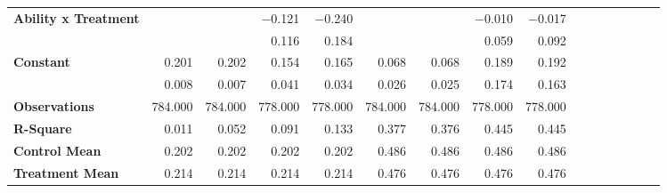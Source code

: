 \begin{tabular}{@{\extracolsep{5pt}}lrrrrrrrrrrrrrrr}
{\bf Ability x Treatment} & \phantom{***} & \phantom{***} & $-$0.121\phantom{\phantom{)}***} & $-$0.240\phantom{\phantom{)}***} & \phantom{***} & \phantom{***} & $-$0.010\phantom{\phantom{)}***} & $-$0.017\phantom{\phantom{)}***} \\
{\bf } & \phantom{***} & \phantom{***} & 0.116\phantom{\phantom{)}***} & 0.184\phantom{\phantom{)}***} & \phantom{***} & \phantom{***} & 0.059\phantom{\phantom{)}***} & 0.092\phantom{\phantom{)}***} \\
{\bf Constant} & 0.201\phantom{\phantom{)}***} & 0.202\phantom{\phantom{)}***} & 0.154\phantom{\phantom{)}***} & 0.165\phantom{\phantom{)}***} & 0.068\phantom{\phantom{)}***} & 0.068\phantom{\phantom{)}***} & 0.189\phantom{\phantom{)}***} & 0.192\phantom{\phantom{)}***} \\
{\bf } & 0.008\phantom{\phantom{)}***} & 0.007\phantom{\phantom{)}***} & 0.041\phantom{\phantom{)}***} & 0.034\phantom{\phantom{)}***} & 0.026\phantom{\phantom{)}***} & 0.025\phantom{\phantom{)}***} & 0.174\phantom{\phantom{)}***} & 0.163\phantom{\phantom{)}***} \\
{\bf Observations} & 784.000\phantom{\phantom{)}***} & 784.000\phantom{\phantom{)}***} & 778.000\phantom{\phantom{)}***} & 778.000\phantom{\phantom{)}***} & 784.000\phantom{\phantom{)}***} & 784.000\phantom{\phantom{)}***} & 778.000\phantom{\phantom{)}***} & 778.000\phantom{\phantom{)}***} \\
{\bf R-Square} & 0.011\phantom{***} & 0.052\phantom{***} & 0.091\phantom{***} & 0.133\phantom{***} & 0.377\phantom{***} & 0.376\phantom{***} & 0.445\phantom{***} & 0.445\phantom{***} \\
{\bf Control Mean} & 0.202\phantom{***} & 0.202\phantom{***} & 0.202\phantom{***} & 0.202\phantom{***} & 0.486\phantom{***} & 0.486\phantom{***} & 0.486\phantom{***} & 0.486\phantom{***} \\
{\bf Treatment Mean} & 0.214\phantom{***} & 0.214\phantom{***} & 0.214\phantom{***} & 0.214\phantom{***} & 0.476\phantom{***} & 0.476\phantom{***} & 0.476\phantom{***} & 0.476\phantom{***} \\
\hline
\end{tabular}
